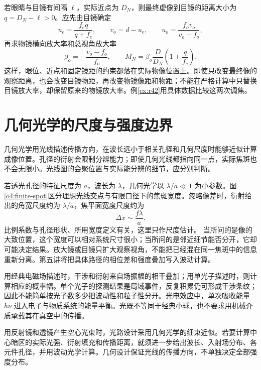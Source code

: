 若眼睛与目镜有间隔 $\ell$，实际近点为 $D_N$，则最终虚像到目镜的距离大小为 $q=D_N-\ell>0$。应先由目镜确定
\[
u_e=\frac{f_eq}{q+f_e},\qquad v_o=d-u_e,\qquad
u_o=\frac{f_ov_o}{v_o-f_o},
\]
再求物镜横向放大率和总视角放大率
\[
\beta_o=-\frac{v_o-f_o}{f_o},\qquad
M_N=\beta_o\frac{D}{D_N}\left(1+\frac q{f_e}\right).
\]
这样，眼位、近点和固定镜距的约束都落在实际物像位置上。即使只改变最终像的观察距离，也会改变目镜物距，再改变物镜像距和物距；不能在严格计算中只替换目镜放大率，却保留原来的物镜放大率。例\ref{ex:r42}用具体数据比较这两次调焦。

\section{几何光学的尺度与强度边界}

几何光学用光线描述传播方向，在波长远小于相关孔径和几何尺度时能够近似计算成像位置。孔径的衍射会限制分辨能力；即使几何光线都指向同一点，实际焦斑也不会无限小。光线图的会聚位置与实际能分辨的细节，应分别判断。

若透光孔径的特征尺度为 $a$，波长为 $\lambda$，几何光学以 $\lambda/a\ll1$ 为小参数。图\ref{o4:finite-spot}区分理想光线交点与有限口径下的焦斑宽度。忽略像差时，衍射给出的角宽尺度约为 $\lambda/a$，焦平面宽度尺度约为
\[
\Delta x\sim\frac{f\lambda}{a}.
\]
比例系数与孔径形状、所用宽度定义有关，这里只作尺度估计。
当所问的是像的大致位置，这个宽度可以相对系统尺寸很小；当所问的是邻近细节能否分开，它却可能决定结果。放大镜或目镜只扩大观察视角，不能把已经混在同一焦斑中的信息重新分离。第五讲将把具体路径的相位差和强度叠加写入波动计算。


用经典电磁场描述时，干涉和衍射来自场振幅的相干叠加；用单光子描述时，则计算相应的概率幅。单个光子的探测结果是局域事件，反复积累仍可形成干涉条纹；因此不能简单按光子数多少把波动性和粒子性分开。光电效应中，单次吸收能量 \(h\nu\) 进入电子与物质系统的能量平衡。光既不等同于经典小球，也不要求用机械介质承载其在真空中的传播。

用反射镜和透镜产生空心光束时，光路设计采用几何光学的细束近似。若要计算中心暗区的实际光强、衍射填充和传播距离，就须进一步给出波长、入射场分布、各元件孔径，并用波动光学计算。几何设计保证光线的传播方向，不单独决定全部强度分布。

